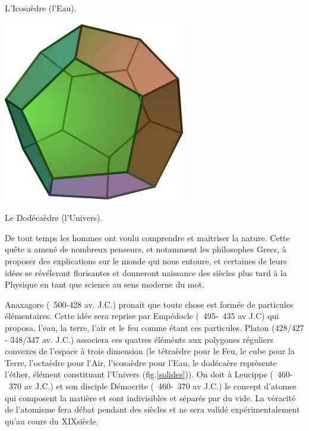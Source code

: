 {\vspace*{-0.25cm}
\begin{center}\normalfont\small {L'Icosaèdre (l'Eau).}\end{center}
\vspace*{-0.25cm}
\includegraphics[width=0.25\marginparwidth]{SM/Dodecahedron.png}
\vspace*{-0.25cm}
\begin{center}\normalfont\small {Le Dodécaèdre (l'Univers).}\end{center}
\vspace*{-0.25cm}
\label{solides}
}
De tout temps les hommes ont voulu comprendre et maitriser la nature. Cette quête a amené de nombreux penseurs, et notamment les philosophes Grecs, à proposer des explications sur le monde qui nous entoure, et certaines de leurs idées se révéleront florisantes et donneront naissance des siècles plus tard à la Physique en tant que science au sens moderne du mot. 

Anaxagore (~500-428 av. J.C.) pronait que toute chose est formée de particules élémentaires. Cette idée sera reprise par Empédocle (~495-~435 av J.C) qui proposa, l'eau, la terre, l'air et le feu comme étant ces particules. Platon (428/427 - 348/347 av. J.C.) associera ces quatres éléménts aux polygones réguliers convexes de l'espace à trois dimension (le tétraèdre pour le Feu, le cube pour la Terre, l'octaèdre pour l'Air, l'icosaèdre pour l'Eau, le dodécaère reprèsente l'éther, élément constituant l'Univers (fig.\ref{solides})). On doit à Leucippe (~460-~370 av J.C.) et son disciple Démocrite (~460-~370 av J.C.) le concept d'atomes qui composent la matière et sont indivisibles et séparés par du vide. La véracité de l'atomisme fera débat pendant des siècles et ne sera validé expérimentalement qu'au cours du XIX\ieme siècle.

